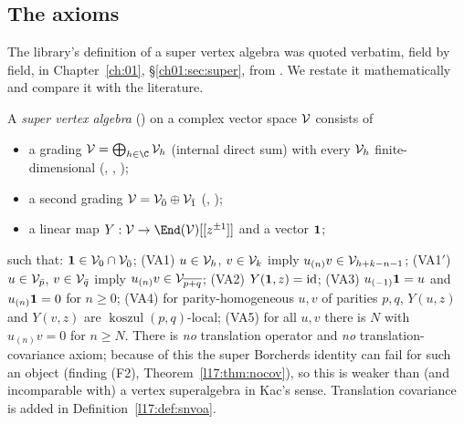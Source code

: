 \subsection{The axioms}

The library's definition of a super vertex algebra was quoted verbatim, field by field, in
Chapter~\ref{ch:01}, §\ref{ch01:sec:super}, from . We restate it mathematically and compare it with the literature.

\begin{definition}\label{l17:def:sva}
A \emph{super vertex algebra} () on a complex vector space $\mathcal{V}$
consists of
\begin{itemize}
\item a grading $\lseventeenV=\bigoplus_{h\in\C}\lseventeenV_h$ (internal direct sum) with every
  $\mathcal{V}_h$ finite-dimensional (, , );
\item a second grading $\mathcal{V}=\mathcal{V}_{\bar0}\oplus\mathcal{V}_{\bar1}$ (,
  );
\item a linear map $Y:\lseventeenV\to\End(\lseventeenV)[[z^{\pm1}]]$ and a vector $\mathbf{1}$;
\end{itemize}
such that: $\mathbf{1}\in\mathcal{V}_0\cap\mathcal{V}_{\bar0}$; (VA1) $u\in\mathcal{V}_h$,
$v\in\mathcal{V}_k$ imply $u_{(n)}v\in\mathcal{V}_{h+k-n-1}$; (VA1$'$) $u\in\mathcal{V}_{\bar p}$,
$v\in\mathcal{V}_{\bar q}$ imply $u_{(n)}v\in\mathcal{V}_{\overline{p+q}}$; (VA2)
$Y(\mathbf{1},z)=\mathrm{id}$; (VA3) $u_{(-1)}\mathbf{1}=u$ and $u_{(n)}\mathbf{1}=0$ for
$n\ge0$; (VA4) for parity-homogeneous $u,v$ of parities $p,q$, $Y(u,z)$ and $Y(v,z)$ are
$\operatorname{koszul}(p,q)$-local; (VA5) for all $u,v$ there is $N$ with $u_{(n)}v=0$ for $n\ge N$.
There is \emph{no} translation operator and \emph{no} translation-covariance axiom; because of this the
super Borcherds identity can fail for such an object (finding (F2), Theorem~\ref{l17:thm:nocov}), so
this is weaker than (and incomparable with) a vertex superalgebra in Kac's sense. Translation
covariance is added in Definition~\ref{l17:def:snvoa}.
\end{definition}

